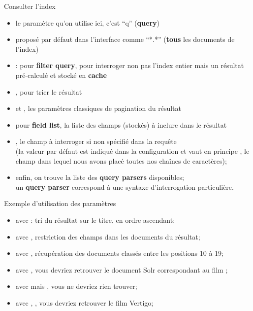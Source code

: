 \begin{frame}{Consulter l'index}

  \begin{itemize}
    \item le paramètre qu'on utilise ici, c'est ``q'' ({\bf query})
    \item proposé par défaut dans l'interface comme ``*.*'' ({\bf tous} les documents de l'index)
      \smallskip
    \item {}: pour {\bf filter query}, pour interroger non pas l'index entier 
      mais un résultat pré-calculé et stocké en {\bf cache}
    \item {}, pour trier le résultat
    \item {} et , les paramètres classiques de pagination du résultat
    \item {}  pour {\bf field list}, la liste des champs (stockés) à inclure dans le résultat
    \item {}, le champ à interroger si non spécifié dans la requête\\ (la valeur par défaut est indiqué
      dans la configuration et vaut en principe , le champ dans lequel nous avons placé
      toutes nos chaînes de caractères);
    \item enfin, on trouve la liste des {\bf query parsers} disponibles; \\
      un {\bf query parser} correspond à une syntaxe d'interrogation particulière.
  \end{itemize}
\end{frame}  

\begin{frame}{Exemple d'utilisation des paramètres}
  \begin{itemize}
\item avec : tri du résultat sur le titre, en ordre ascendant;
\item avec , restriction des champs dans les documents du résultat;
\item avec , récupération des documents classés entre les positions 10 à 19;
\item avec , vous devriez retrouver le document Solr correspondant au film ;
\item avec  mais , vous ne devriez rien trouver;
\item avec , , vous devriez retrouver le film Vertigo;
  \end{itemize}
\end{frame} %

